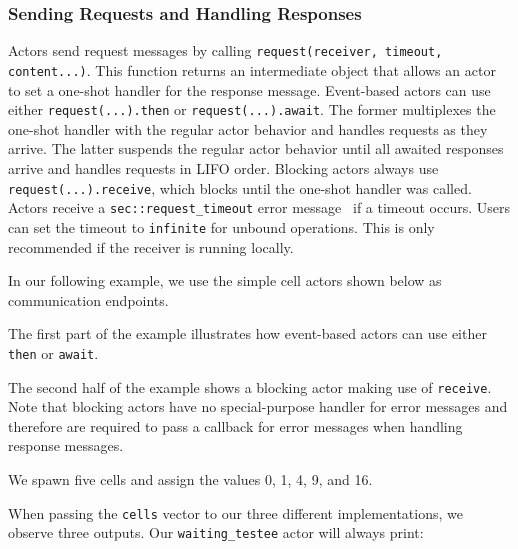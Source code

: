 \subsubsection{Sending Requests and Handling Responses}
\label{handling-response}

Actors send request messages by calling \lstinline^request(receiver, timeout, content...)^. This function returns an intermediate object that allows an actor to set a one-shot handler for the response message. Event-based actors can use either \lstinline^request(...).then^ or \lstinline^request(...).await^. The former multiplexes the one-shot handler with the regular actor behavior and handles requests as they arrive. The latter suspends the regular actor behavior until all awaited responses arrive and handles requests in LIFO order. Blocking actors always use \lstinline^request(...).receive^, which blocks until the one-shot handler was called. Actors receive a \lstinline^sec::request_timeout^  error message~ if a timeout occurs. Users can set the timeout to \lstinline^infinite^ for unbound operations. This is only recommended if the receiver is running locally.

In our following example, we use the simple cell actors shown below as communication endpoints.



The first part of the example illustrates how event-based actors can use either \lstinline^then^ or \lstinline^await^.



\clearpage
The second half of the example shows a blocking actor making use of \lstinline^receive^. Note that blocking actors have no special-purpose handler for error messages and therefore are required to pass a callback for error messages when handling response messages.



We spawn five cells and assign the values 0, 1, 4, 9, and 16.



When passing the \lstinline^cells^ vector to our three different implementations, we observe three outputs. Our \lstinline^waiting_testee^ actor will always print:

